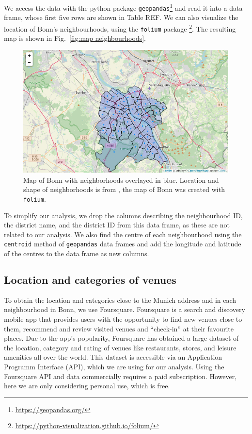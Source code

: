 \documentclass[UKenglish]{scrreprt}
\begin{document}
We access the data with the python package \verb|geopandas|\footnote{\href{https://geopandas.org/}{https://geopandas.org/}} and read it into a data frame, whose first five rows are shown in Table REF. We can also visualize the location of Bonn's neighbourhoods, using the \verb|folium| package \footnote{\href{https://python-visualization.github.io/folium/}{https://python-visualization.github.io/folium/}}. The resulting map is shown in Fig.~\ref{fig:map neighbourhoods}.

\begin{figure}[htbp]
	\centering
	\includegraphics[width=\textwidth]{Figs/Map_Neighborhoods.png}
	\caption{Map of Bonn with neighborhoods overlayed in blue. Location and shape of neighborhoods is from \cite{Ortsteile}, the map of Bonn was created with \texttt{folium}.}
	\label{fig:map neighborhoods}
\end{figure}

To simplify our analysis, we drop the columns describing the neighbourhood ID, the district name, and the district ID from this data frame, as these are not related to our analysis. We also find the centre of each neighbourhood using the \verb|centroid| method of \verb|geopandas| data frames and add the longitude and latitude of the centres to the data frame as new columns.

\subsection{Location and categories of venues}
To obtain the location and categories close to the Munich address and in each neighbourhood in Bonn, we use Foursquare. 
Foursquare is a search and discovery mobile app that provides users with the opportunity to find new venues close to them, recommend and review visited venues and \enquote{check-in} at their favourite places. Due to the app's popularity, Foursquare has obtained a large dataset of the location, category and rating of venues like restaurants, stores, and leisure amenities all over the world. This dataset is accessible via an Application Programm Interface (API), which we are using for our analysis.
Using the Foursquare API and data commercially requires a paid subscription. However, here we are only considering personal use, which is free. 
\end{document}

